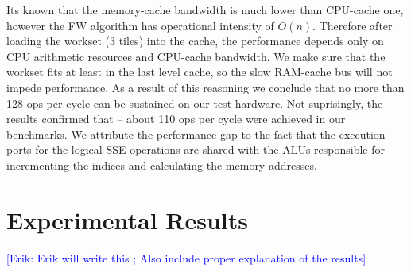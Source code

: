 \documentclass[letterpaper]{article}
\newcommand{\erik}[1]{\textcolor{blue}{[Erik: #1]}}
\begin{document}
Its known that the memory-cache bandwidth is much lower than CPU-cache one, however the FW algorithm has operational intensity of \(O(n)\). 
Therefore after loading the workset (3 tiles) into the cache, the performance depends only on CPU arithmetic resources and CPU-cache bandwidth. 
We make sure that the workset fits at least in the last level cache, so the slow RAM-cache bus will not impede performance. As a result of this reasoning we conclude that no more than 
128 ops per cycle can be sustained on our test hardware. Not suprisingly, the results confirmed that -- about 110 ops per cycle were achieved in our benchmarks. We attribute the performance gap to the fact that 
the execution ports for the logical SSE operations are shared with the ALUs responsible for incrementing the indices and calculating the memory addresses.

\section{Experimental Results}\label{sec:exp}
\erik{Erik will write this ; Also include proper explanation of the results}
\end{document}
